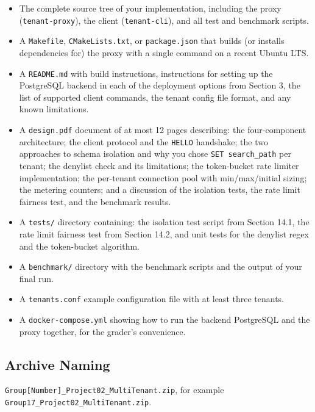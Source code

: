 \documentclass[11pt,a4paper]{article}
\begin{document}
\begin{itemize}
\item The complete source tree of your implementation, including the proxy (\texttt{tenant-proxy}), the client (\texttt{tenant-cli}), and all test and benchmark scripts.

\item A \texttt{Makefile}, \texttt{CMakeLists.txt}, or \texttt{package.json} that builds (or installs dependencies for) the proxy with a single command on a recent Ubuntu LTS.

\item A \texttt{README.md} with build instructions, instructions for setting up the PostgreSQL backend in each of the deployment options from Section 3, the list of supported client commands, the tenant config file format, and any known limitations.

\item A \texttt{design.pdf} document of at most 12 pages describing: the four-component architecture; the client protocol and the \texttt{HELLO} handshake; the two approaches to schema isolation and why you chose \texttt{SET search\_path} per tenant; the denylist check and its limitations; the token-bucket rate limiter implementation; the per-tenant connection pool with min/max/initial sizing; the metering counters; and a discussion of the isolation tests, the rate limit fairness test, and the benchmark results.

\item A \texttt{tests/} directory containing: the isolation test script from Section 14.1, the rate limit fairness test from Section 14.2, and unit tests for the denylist regex and the token-bucket algorithm.

\item A \texttt{benchmark/} directory with the benchmark scripts and the output of your final run.

\item A \texttt{tenants.conf} example configuration file with at least three tenants.

\item A \texttt{docker-compose.yml} showing how to run the backend PostgreSQL and the proxy together, for the grader's convenience.
\end{itemize}

\subsection{Archive Naming}
\texttt{Group[Number]\_Project02\_MultiTenant.zip}, for example \texttt{Group17\_Project02\_MultiTenant.zip}.
\end{document}
